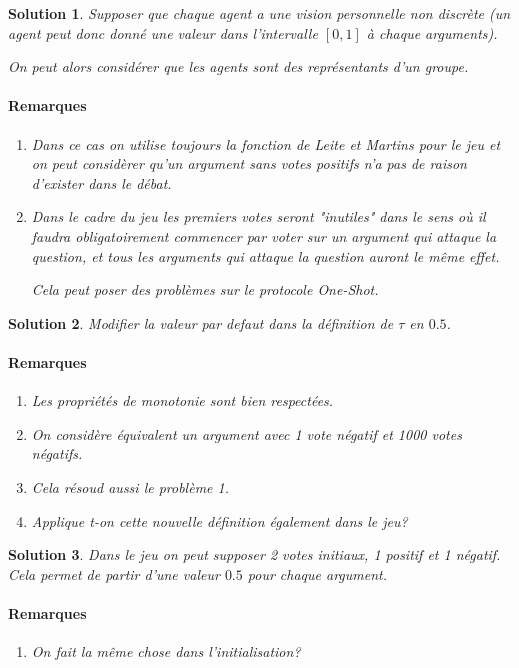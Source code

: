 \documentclass[12pt]{article}
\theoremstyle{defi}
\theoremstyle{not}
\theoremstyle{prob}
\newtheorem{solution}{Solution}
\begin{document}
  \begin{solution}
    Supposer que chaque agent a une vision personnelle non discrète (un agent peut donc donné une valeur dans l'intervalle $[0,1]$ à chaque arguments).

    On peut alors considérer que les agents sont des représentants d'un groupe.

    \paragraph{Remarques}
      \begin{enumerate}
        \item Dans ce cas on utilise toujours la fonction de Leite et Martins pour le jeu et on peut considèrer qu'un argument sans votes positifs n'a pas de raison d'exister dans le débat.

        \item Dans le cadre du jeu les premiers votes seront "inutiles" dans le sens où il faudra obligatoirement commencer par voter sur un argument qui attaque la question, et tous les arguments qui attaque la question auront le même effet.

        Cela peut poser des problèmes sur le protocole One-Shot.
      \end{enumerate}
  \end{solution}

  \begin{solution}
    Modifier la valeur par defaut dans la définition de $\tau$ en $0.5$.

    \paragraph{Remarques}
      \begin{enumerate}
        \item Les propriétés de monotonie sont bien respectées.
        \item On considère équivalent un argument avec 1 vote négatif et 1000 votes négatifs.
        \item Cela résoud aussi le problème 1.
        \item Applique t-on cette nouvelle définition également dans le jeu?
      \end{enumerate}
  \end{solution}

  \begin{solution}
    Dans le jeu on peut supposer 2 votes initiaux, 1 positif et 1 négatif. Cela permet de partir d'une valeur $0.5$ pour chaque argument.

    \paragraph{Remarques}
      \begin{enumerate}
        \item On fait la même chose dans l'initialisation?
      \end{enumerate}
  \end{solution}
\end{document}
